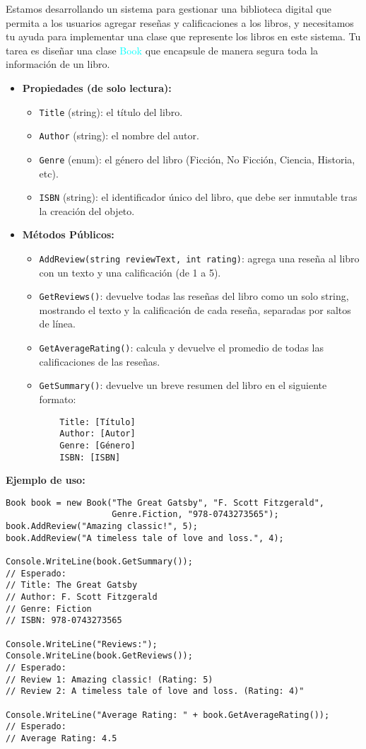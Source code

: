 Estamos desarrollando un sistema para gestionar una biblioteca digital que permita a los usuarios agregar reseñas y calificaciones a los libros, y necesitamos tu ayuda para implementar una clase que represente los libros en este sistema. Tu tarea es diseñar una clase \textcolor{cyan}{Book} que encapsule de manera segura toda la información de un libro.

\begin{itemize}
    \item \textbf{Propiedades (de solo lectura):}
    \begin{itemize}
        \item \texttt{Title} (string): el título del libro.
        \item \texttt{Author} (string): el nombre del autor.
        \item \texttt{Genre} (enum): el género del libro (Ficción, No Ficción, Ciencia, Historia, etc).
        \item \texttt{ISBN} (string): el identificador único del libro, que debe ser inmutable tras la creación del objeto.
    \end{itemize}
    
    \item \textbf{Métodos Públicos:}
    \begin{itemize}
        \item \texttt{AddReview(string reviewText, int rating)}: agrega una reseña al libro con un texto y una calificación (de 1 a 5).
        \item \texttt{GetReviews()}: devuelve todas las reseñas del libro como un solo string, mostrando el texto y la calificación de cada reseña, separadas por saltos de línea.
        \item \texttt{GetAverageRating()}: calcula y devuelve el promedio de todas las calificaciones de las reseñas.
        \item \texttt{GetSummary()}: devuelve un breve resumen del libro en el siguiente formato:
        \begin{verbatim}
    Title: [Título]
    Author: [Autor]
    Genre: [Género]
    ISBN: [ISBN]
        \end{verbatim}
    \end{itemize}
\end{itemize}

\textbf{Ejemplo de uso:}
\begin{lstlisting}
Book book = new Book("The Great Gatsby", "F. Scott Fitzgerald",
                     Genre.Fiction, "978-0743273565");
book.AddReview("Amazing classic!", 5); 
book.AddReview("A timeless tale of love and loss.", 4); 

Console.WriteLine(book.GetSummary()); 
// Esperado: 
// Title: The Great Gatsby
// Author: F. Scott Fitzgerald
// Genre: Fiction
// ISBN: 978-0743273565

Console.WriteLine("Reviews:");
Console.WriteLine(book.GetReviews()); 
// Esperado:
// Review 1: Amazing classic! (Rating: 5)
// Review 2: A timeless tale of love and loss. (Rating: 4)"

Console.WriteLine("Average Rating: " + book.GetAverageRating()); 
// Esperado: 
// Average Rating: 4.5
\end{lstlisting}

